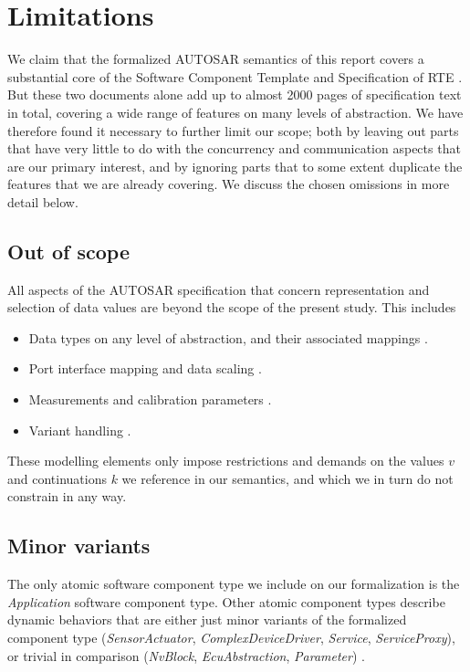 \documentclass[10pt,conference]{IEEEtran}
\begin{document}
\section{Limitations}

We claim that the formalized AUTOSAR semantics of this report covers a substantial core of the Software Component Template and Specification of RTE \cite{AR:SWC, AR:RTE}. But these two documents alone add up to almost 2000 pages of specification text in total, covering a wide range of features on many levels of abstraction. We have therefore found it necessary to further limit our scope; both by leaving out parts that have very little to do with the concurrency and communication aspects that are our primary interest, and by ignoring parts that to some extent duplicate the features that we are already covering. We discuss the chosen omissions in more detail below.

\subsection{Out of scope}

All aspects of the AUTOSAR specification that concern representation and selection of data values are beyond the scope of the present study. This includes
\begin{itemize}
\item Data types on any level of abstraction, and their associated mappings \cite[ch.~5]{AR:SWC}.
\item Port interface mapping and data scaling \cite[ch.~4.3]{AR:SWC}.
\item Measurements and calibration parameters \cite[ch.~2.2]{AR:SWC}.
\item Variant handling \cite[ch.~2.4]{AR:SWC}.
\end{itemize}
These modelling elements only impose restrictions and demands on the values $v$ and continuations $k$ we reference in our semantics, and which we in turn do not constrain in any way.


\subsection{Minor variants}

The only atomic software component type we include on our formalization is the \emph{Application} software component type. Other atomic component types describe dynamic behaviors that are either just minor variants of the formalized component type (\emph{SensorActuator}, \emph{ComplexDeviceDriver}, \emph{Service}, \emph{ServiceProxy}), or trivial in comparison (\emph{NvBlock}, \emph{EcuAbstraction}, \emph{Parameter}) \cite[ch.~3.2.3]{AR:SWC}.
\end{document}

